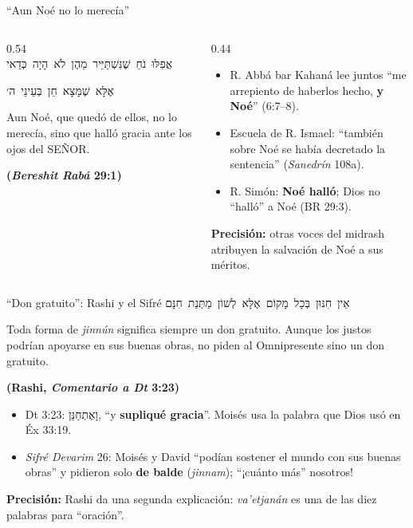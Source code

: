 \documentclass[hyperref={bookmarks=false},aspectratio=169]{beamer}
\newcommand{\heb}[1]{\mbox{\foreignlanguage{hebrew}{#1}}}
\newcommand{\SENOR}{S{\fontsize{0.78em}{1em}\selectfont EÑOR}}
\newcommand{\fuente}[1]{\par\hfill{\upshape\bfseries\footnotesize\textcolor{azul}{#1}}}
\newcommand{\destacar}[1]{\textbf{\textcolor{azul}{#1}}}
\newcommand{\precision}[1]{{\footnotesize\color{gris}\textbf{Precisión:} #1}}
\begin{document}
\begin{frame}{``Aun Noé no lo merecía''}
\begin{columns}[t,onlytextwidth]
\begin{column}{0.54\textwidth}
\centering\heb{אֲפִלּוּ נֹחַ שֶׁנִּשְׁתַּיֵּיר מֵהֶן לֹא הָיָה כְּדַאי}\par\heb{אֶלָּא שֶׁמָּצָא חֵן בְּעֵינֵי ה׳}
\begin{cita}Aun Noé, que quedó de ellos, no lo merecía, sino que halló gracia ante los ojos del \SENOR.\fuente{(\emph{Bereshit Rabá} 29:1)}\end{cita}
\end{column}
\begin{column}{0.44\textwidth}\small\RaggedRight
\begin{itemize}
\item R. Abbá bar Kahaná lee juntos ``me arrepiento de haberlos hecho, \destacar{y Noé}'' (6:7--8).
\item Escuela de R. Ismael: ``también sobre Noé se había decretado la sentencia'' (\emph{Sanedrín} 108a).
\item R. Simón: \destacar{Noé halló}; Dios no ``halló'' a Noé (BR 29:3).
\end{itemize}
\precision{otras voces del midrash atribuyen la salvación de Noé a sus méritos.}
\end{column}
\end{columns}
\end{frame}

\begin{frame}{``Don gratuito'': Rashi y el Sifré}
\centering\heb{אֵין חִנּוּן בְּכָל מָקוֹם אֶלָּא לְשׁוֹן מַתְּנַת חִנָּם}
\begin{cita}Toda forma de \emph{jinnún} significa siempre un don gratuito. Aunque los justos podrían apoyarse en sus buenas obras, no piden al Omnipresente sino un don gratuito.\fuente{(Rashi, \emph{Comentario a Dt} 3:23)}\end{cita}
\small\RaggedRight
\begin{itemize}
\item Dt 3:23: \heb{וָאֶתְחַנַּן}, ``y \destacar{supliqué gracia}''. Moisés usa la palabra que Dios usó en Éx 33:19.
\item \emph{Sifré Devarim} 26: Moisés y David ``podían sostener el mundo con sus buenas obras'' y pidieron solo \destacar{de balde} (\emph{jinnam}); ``¡cuánto más'' nosotros!
\end{itemize}
\precision{Rashi da una segunda explicación: \emph{va'etjanán} es una de las diez palabras para ``oración''.}
\end{frame}
\end{document}
